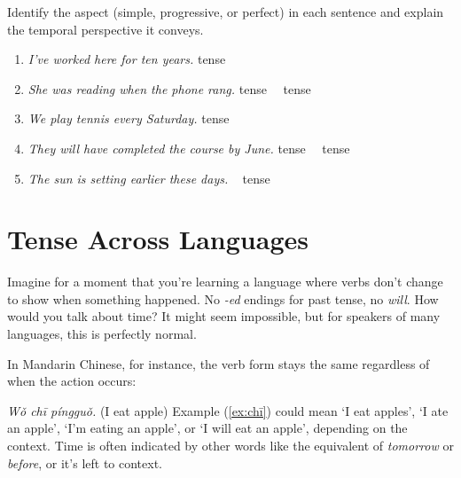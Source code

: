 \begin{tcolorbox}[title=Exercise: Aspect, colback=white, colframe=purple!75!black, fonttitle=\bfseries]
Identify the aspect (simple, progressive, or perfect) in each sentence and explain the temporal perspective it conveys.

\begin{enumerate}[nosep]
    \item \textit{I've worked here for ten years.} \hfill\uline{\hspace{2cm}} tense
    \item \textit{She was reading when the phone rang.} \hfill\uline{\hspace{2cm}} tense~~\uline{\hspace{2cm}} tense
    \item \textit{We play tennis every Saturday.} \hfill\uline{\hspace{2cm}} tense
    \item \textit{They will have completed the course by June.} \hfill\uline{\hspace{2cm}} tense~~\uline{\hspace{2cm}} tense
    \item \textit{The sun is setting earlier these days.}  ~\hfill\uline{\hspace{2cm}} tense
\end{enumerate}
\end{tcolorbox}

\section{Tense Across Languages}

Imagine for a moment that you're learning a language where verbs don't change to show when something happened. No \textit{-ed} endings for past tense, no \textit{will}. How would you talk about time? It might seem impossible, but for speakers of many languages, this is perfectly normal.

In Mandarin Chinese, for instance, the verb form stays the same regardless of when the action occurs:

\ea \textit{Wǒ chī píngguǒ.} (I eat apple)\label{ex:chī}
\z
Example (\ref{ex:chī}) could mean `I eat apples', `I ate an apple', `I'm eating an apple', or `I will eat an apple', depending on the context. Time is often indicated by other words like the equivalent of \textit{tomorrow} or \textit{before}, or it's left to context.

